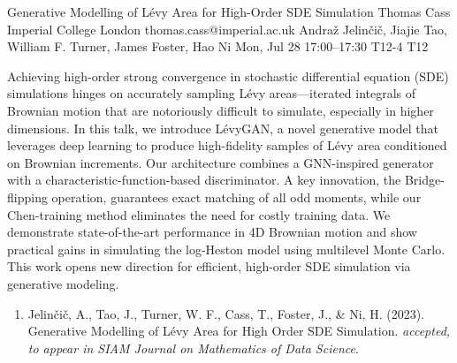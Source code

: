 \begin{talk}
  {Generative Modelling of L\'evy Area for High-Order SDE Simulation}%
  {Thomas Cass}%
  {Imperial College London}%
  {thomas.cass@imperial.ac.uk}%
  {Andra\v{z} Jelin\v{c}i\v{c},  Jiajie Tao, William F. Turner, James Foster, Hao Ni}%
  {}%
  {Mon, Jul 28 17:00--17:30}%
  {T12-4}%
  {T12}%
  
    
Achieving high-order strong convergence in stochastic differential equation (SDE) simulations hinges on accurately sampling L\'evy areas—iterated integrals of Brownian motion that are notoriously difficult to simulate, especially in higher dimensions. In this talk, we introduce L\'evyGAN, a novel generative model that leverages deep learning to produce high-fidelity samples of L\'evy area conditioned on Brownian increments. Our architecture combines a GNN-inspired generator with a characteristic-function-based discriminator. A key innovation, the Bridge-flipping operation, guarantees exact matching of all odd moments, while our Chen-training method eliminates the need for costly training data. We demonstrate state-of-the-art performance in 4D Brownian motion and show practical gains in simulating the log-Heston model using multilevel Monte Carlo. This work opens new direction for efficient, high-order SDE simulation via generative modeling.


\medskip

\begin{enumerate}
 \item[{[1]}] Jelin\v{c}i\v{c}, A., Tao, J., Turner, W. F., Cass, T., Foster, J., \& Ni, H. (2023). Generative Modelling of L\'evy Area for High Order SDE Simulation. \textit{accepted, to appear in SIAM Journal on Mathematics of Data Science}.
\end{enumerate}
\end{talk}

